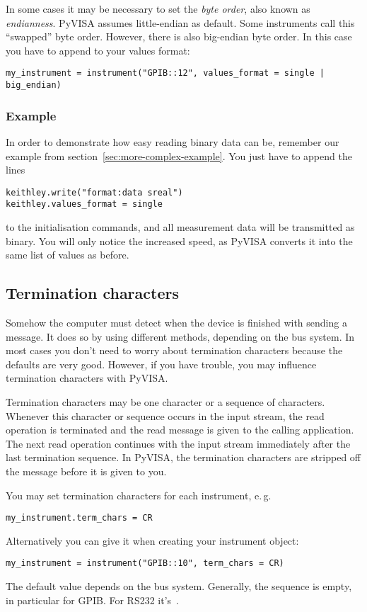 \documentclass{howto}
\begin{document}
In some cases it may be necessary to set the \emph{byte order}, also known as
\emph{endianness}.  PyVISA assumes little-endian as default.  Some instruments
call this ``swapped'' byte order.  However, there is also big-endian byte
order.  In this case you have to append  to your values
format:
\begin{verbatim}
my_instrument = instrument("GPIB::12", values_format = single | big_endian)
\end{verbatim}


\subsubsection{Example}
\label{sec:binary-example}

In order to demonstrate how easy reading binary data can be, remember our
example from section~\ref{sec:more-complex-example}.  You just have to append
the lines
\begin{verbatim}
keithley.write("format:data sreal")
keithley.values_format = single
\end{verbatim}
to the initialisation commands, and all measurement data will be transmitted as
binary.  You will only notice the increased speed, as PyVISA converts it into
the same list of values as before.


\subsection{Termination characters}
\label{sec:termchars}

Somehow the computer must detect when the device is finished with sending a
message.  It does so by using different methods, depending on the bus system.
In most cases you don't need to worry about termination characters because the
defaults are very good.  However, if you have trouble, you may influence
termination characters with PyVISA\@.

Termination characters may be one character or a sequence of characters.
Whenever this character or sequence occurs in the input stream, the read
operation is terminated and the read message is given to the calling
application.  The next read operation continues with the input stream
immediately after the last termination sequence.  In PyVISA, the termination
characters are stripped off the message before it is given to you.

You may set termination characters for each instrument, e.\,g.
\begin{verbatim}
my_instrument.term_chars = CR
\end{verbatim}
Alternatively you can give it when creating your instrument object:
\begin{verbatim}
my_instrument = instrument("GPIB::10", term_chars = CR)
\end{verbatim}
The default value depends on the bus system.  Generally, the sequence is empty,
in particular for GPIB\@.  For RS232 it's~\@.
\end{document}
